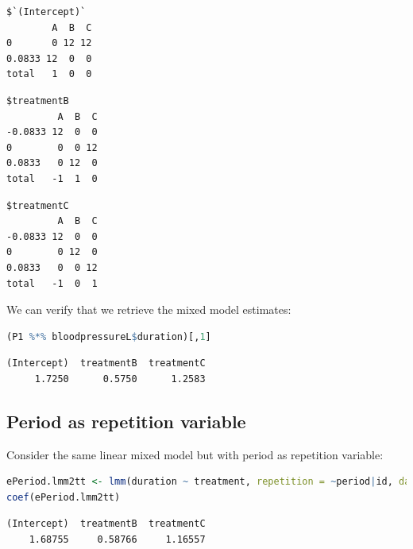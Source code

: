\documentclass[12pt]{article}
\begin{document}
\begin{minipage}{0.3\linewidth}
\label{}
\begin{verbatim}
$`(Intercept)`
        A  B  C
0       0 12 12
0.0833 12  0  0
total   1  0  0
\end{verbatim}


\end{minipage}
\begin{minipage}{0.3\linewidth}
\label{}
\begin{verbatim}
$treatmentB
         A  B  C
-0.0833 12  0  0
0        0  0 12
0.0833   0 12  0
total   -1  1  0
\end{verbatim}

\end{minipage}
\begin{minipage}{0.3\linewidth}
\label{}
\begin{verbatim}
$treatmentC
         A  B  C
-0.0833 12  0  0
0        0 12  0
0.0833   0  0 12
total   -1  0  1
\end{verbatim}

\end{minipage}



\noindent We can verify that we retrieve the mixed model estimates:
\begin{lstlisting}[language=r,numbers=none]
(P1 %*% bloodpressureL$duration)[,1]
\end{lstlisting}

\label{}
\begin{verbatim}
(Intercept)  treatmentB  treatmentC 
     1.7250      0.5750      1.2583
\end{verbatim}


\clearpage
\subsection{Period as repetition variable}
\label{SM:lmm2average2}
Consider the same linear mixed model but with period as repetition variable:
\begin{lstlisting}[language=r,numbers=none]
ePeriod.lmm2tt <- lmm(duration ~ treatment, repetition = ~period|id, data = bloodpressureL)
coef(ePeriod.lmm2tt)
\end{lstlisting}

\label{}
\begin{verbatim}
(Intercept)  treatmentB  treatmentC 
    1.68755     0.58766     1.16557
\end{verbatim}
\end{document}
